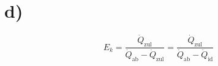 

\section*{d)}
\[
E_k = \frac{\dot{Q}_{\text{zul}}}{\dot{Q}_{\text{ab}} - \dot{Q}_{\text{zul}}} = \frac{\dot{Q}_{\text{zul}}}{\dot{Q}_{\text{ab}} - \dot{Q}_{\text{id}}}
\]